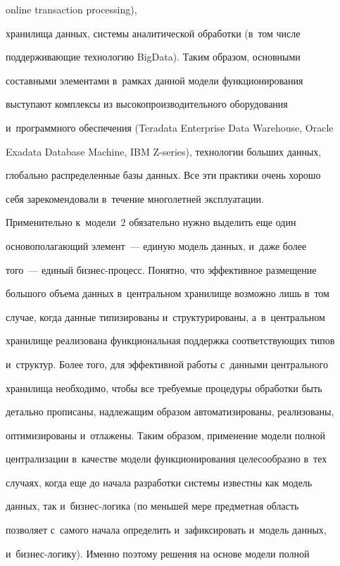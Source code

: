 online transaction processing), 


хранилища данных, системы аналитической обработки (в~том числе 


поддерживающие технологию BigData). Таким образом, основными 


составными элементами в~рамках данной модели функционирования 


выступают комплексы из высокопроизводительного оборудования 


и~программного обеспечения (Teradata Enterprise Data Warehouse, Oracle 


Exadata Database Machine, IBM Z-series), технологии больших данных, 


глобально распределенные базы данных. Все эти практики очень хорошо 


себя зарекомендовали в~течение многолетней эксплуатации.





Применительно к~модели~2 обязательно нужно выделить еще один 


основополагающий элемент~--- единую модель данных, и~даже более  


того~--- единый биз\-нес-про\-цесс. Понятно, что эффективное размещение 


большого объема данных в~центральном хранилище возможно лишь в~том 


случае, когда данные типизированы и~структурированы, а~в~центральном 


хранилище реализована функциональная поддержка соответствующих типов 


и~структур. Более того, для эффективной работы с~данными центрального 


хранилища необходимо, чтобы все требуемые процедуры обработки быть 


детально прописаны, надлежащим образом автоматизированы, реализованы, 


оптимизированы и~отлажены. Таким образом, применение модели полной 


централизации в~качестве модели функционирования целесообразно в~тех 


случаях, когда еще до начала разработки системы известны как модель 


данных, так и~бизнес-логика (по меньшей мере предметная область 


позволяет с~самого начала определить и~зафиксировать и~модель данных, 


и~бизнес-логику). Именно поэтому решения на основе модели полной 


